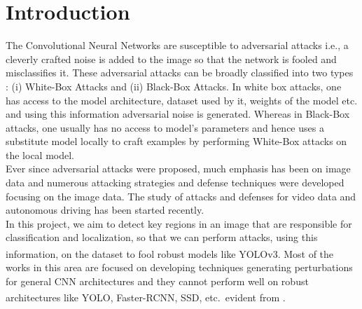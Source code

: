 \documentclass[letterpaper]{article}
\begin{document}
\section{Introduction}
The Convolutional Neural Networks are susceptible to adversarial attacks i.e., a cleverly crafted noise is added to the image so that the network is fooled and misclassifies it. These adversarial attacks can be broadly classified into two types :  (i) White-Box Attacks and (ii) Black-Box Attacks. In white box attacks, one has access to the model architecture, dataset used by it, weights of the model etc. and using this information adversarial noise is generated. Whereas in Black-Box attacks, one usually has no access to model's parameters and hence uses a substitute model locally to craft examples by performing White-Box attacks on the local model.\\
Ever since adversarial attacks were proposed, much emphasis has been on image data and numerous attacking strategies and defense techniques were developed focusing on the image data. The study of attacks and defenses for video data and autonomous driving has been started recently.\\
In this project, we aim to detect key regions in an image that are responsible for classification and localization, so that we can perform attacks, using this information, on the dataset to fool robust models like YOLOv3\textsuperscript{\cite{redmon2018yolov3}}. Most of the works in this area are focused on developing techniques generating perturbations for general CNN architectures and they cannot perform well on robust architectures like YOLO, Faster-RCNN\textsuperscript{\cite{ren2016faster}}, SSD\textsuperscript{\cite{Liu_2016}}, etc.\ evident from .\\
\end{document}
